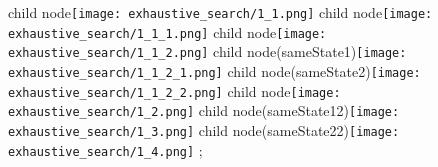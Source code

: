 child{
    node{\texttt{[image: exhaustive\_search/1\_1.png]}}
    child{
        node{\texttt{[image: exhaustive\_search/1\_1\_1.png]}}
    } child {
        node{\texttt{[image: exhaustive\_search/1\_1\_2.png]}}
        child{
            node(sameState1){\texttt{[image: exhaustive\_search/1\_1\_2\_1.png]}}
        } child{
            node(sameState2){\texttt{[image: exhaustive\_search/1\_1\_2\_2.png]}}
        }
    }
} child{
    node{\texttt{[image: exhaustive\_search/1\_2.png]}}
} child{
    node(sameState12){\texttt{[image: exhaustive\_search/1\_3.png]}}
} child{
    node(sameState22){\texttt{[image: exhaustive\_search/1\_4.png]}}
};